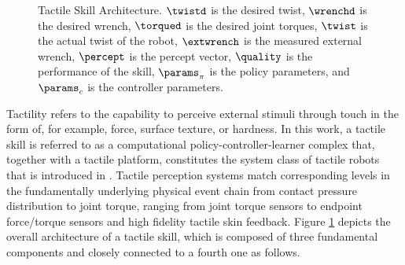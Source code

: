 \begin{figure}
    \centering
    
    \caption{Tactile Skill Architecture. $\twistd$ is the desired twist, $\wrenchd$ is the desired wrench, $\torqued$ is the desired joint torques, $\twist$ is the actual twist of the robot, $\extwrench$ is the measured external wrench, $\percept$ is the percept vector, $\quality$ is the performance of the skill, $\params_\pi$ is the policy parameters, and $\params_c$ is the controller parameters.}
    \label{fig:foundations:representation:tactile_skill}
\end{figure}

Tactility \cite{mcglone2014discriminative} refers to the capability to perceive external stimuli through touch in the form of, for example, force, surface texture, or hardness.
In this work, a tactile skill is referred to as a computational policy-controller-learner complex that, together with a tactile platform, constitutes the system class of tactile robots that is introduced in \cite{haddadin2018tactile}.
Tactile perception systems match corresponding levels in the fundamentally underlying physical event chain from contact pressure distribution to joint torque, ranging from joint torque sensors to endpoint force/torque sensors and high fidelity tactile skin feedback.
Figure \ref{fig:foundations:representation:tactile_skill} depicts the overall architecture of a tactile skill, which is composed of three fundamental components and closely connected to a fourth one as follows.

